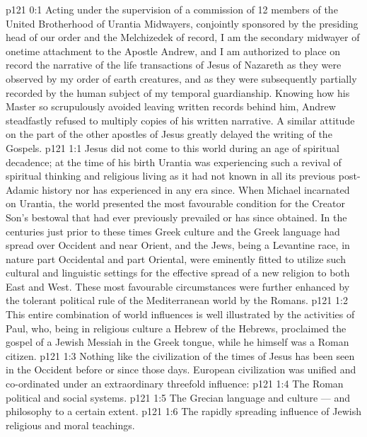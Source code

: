 \author{Midwayer Commission}
\vs p121 0:1 Acting under the supervision of a commission of 12 members of the United Brotherhood of Urantia Midwayers, conjointly sponsored by the presiding head of our order and the Melchizedek of record, I am the secondary midwayer of onetime attachment to the Apostle Andrew, and I am authorized to place on record the narrative of the life transactions of Jesus of Nazareth as they were observed by my order of earth creatures, and as they were subsequently partially recorded by the human subject of my temporal guardianship. Knowing how his Master so scrupulously avoided leaving written records behind him, Andrew steadfastly refused to multiply copies of his written narrative. A similar attitude on the part of the other apostles of Jesus greatly delayed the writing of the Gospels.
\vs p121 1:1 Jesus did not come to this world during an age of spiritual decadence; at the time of his birth Urantia was experiencing such a revival of spiritual thinking and religious living as it had not known in all its previous post\hyp{}Adamic history nor has experienced in any era since. When Michael incarnated on Urantia, the world presented the most favourable condition for the Creator Son’s bestowal that had ever previously prevailed or has since obtained. In the centuries just prior to these times Greek culture and the Greek language had spread over Occident and near Orient, and the Jews, being a Levantine race, in nature part Occidental and part Oriental, were eminently fitted to utilize such cultural and linguistic settings for the effective spread of a new religion to both East and West. These most favourable circumstances were further enhanced by the tolerant political rule of the Mediterranean world by the Romans.
\vs p121 1:2 This entire combination of world influences is well illustrated by the activities of Paul, who, being in religious culture a Hebrew of the Hebrews, proclaimed the gospel of a Jewish Messiah in the Greek tongue, while he himself was a Roman citizen.
\vs p121 1:3 Nothing like the civilization of the times of Jesus has been seen in the Occident before or since those days. European civilization was unified and co\hyp{}ordinated under an extraordinary threefold influence:
\vs p121 1:4 \bibnobreakspace The Roman political and social systems.
\vs p121 1:5 \bibnobreakspace The Grecian language and culture --- and philosophy to a certain extent.
\vs p121 1:6 \bibnobreakspace The rapidly spreading influence of Jewish religious and moral teachings.
